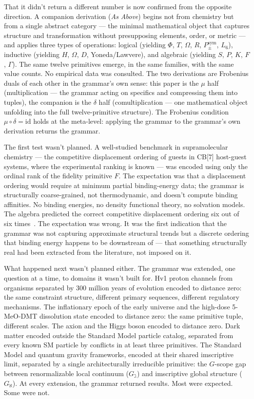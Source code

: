 \documentclass[12pt,a4paper]{article}
\begin{document}
That it didn't return a different number is now confirmed from the opposite
direction. A companion derivation (\emph{As Above}) begins not
from chemistry but from a single abstract category --- the minimal
mathematical object that captures structure and transformation without
presupposing elements, order, or metric --- and applies three types of
operations: logical (yielding $\Phi$, $T$, $\Omega$, $R$, $P_{\pm}^{\text{sym}}$,
$L_6$), inductive (yielding $H$, $\Omega$, $D$, Yoneda/Lawvere), and
algebraic (yielding $S$, $P$, $K$, $F$, $\Gamma$). The same twelve
primitives emerge, in the same families, with the same value counts.
No empirical data was consulted. The two derivations are Frobenius
duals of each other in the grammar's own sense: this paper is the
$\mu$ half (multiplication --- the grammar acting on specifics and
compressing them into tuples), the companion is the $\delta$ half
(comultiplication --- one mathematical object unfolding into the
full twelve-primitive structure). The Frobenius condition
$\mu \circ \delta = \mathrm{id}$ holds at the meta-level: applying
the grammar to the grammar's own derivation returns the grammar.

The first test wasn't planned. A well-studied benchmark in
supramolecular chemistry --- the competitive displacement ordering of
guests in CB[7] host-guest systems, where the experimental ranking is
known --- was encoded using only the ordinal rank of the fidelity
primitive $F$. The expectation was that a displacement ordering would
require at minimum partial binding-energy data; the grammar is
structurally coarse-grained, not thermodynamic, and doesn't compute
binding affinities. No binding energies, no density functional theory,
no solvation models. The algebra predicted the correct competitive
displacement ordering six out of six times~\cite{kim2001,assaf2015}.
The expectation was wrong. It was the first indication that the grammar
was not capturing approximate structural trends but a discrete ordering
that binding energy happens to be downstream of --- that something
structurally real had been extracted from the literature, not imposed
on it.

What happened next wasn't planned either. The grammar was extended,
one question at a time, to domains it wasn't built for. Hv1 proton
channels from organisms separated by 300 million years of evolution
encoded to distance zero: the same constraint structure, different
primary sequences, different regulatory mechanisms. The inflationary
epoch of the early universe and the high-dose 5-MeO-DMT dissolution
state encoded to distance zero: the same primitive tuple, different
scales. The axion and the Higgs boson encoded to distance zero. Dark
matter encoded outside the Standard Model particle catalog, separated
from every known SM particle by conflicts in at least three primitives.
The Standard Model and quantum gravity frameworks, encoded at their shared
imscriptive limit, separated by a single architecturally irreducible primitive:
the $G$-scope gap between renormalizable local continuum ($G_\gimel$) and
imscriptive global structure ($G_\aleph$). At every extension, the grammar returned results.
Most were expected. Some were not.
\end{document}
